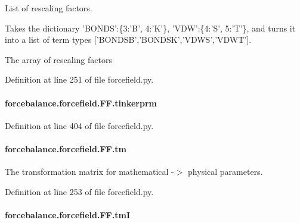 List of rescaling factors. 

Takes the dictionary 'B\-O\-N\-D\-S'\-:\{3\-:'B', 4\-:'K'\}, 'V\-D\-W'\-:\{4\-:'S', 5\-:'T'\}, and turns it into a list of term types \mbox{[}'B\-O\-N\-D\-S\-B','B\-O\-N\-D\-S\-K','V\-D\-W\-S','V\-D\-W\-T'\mbox{]}.

The array of rescaling factors 

Definition at line 251 of file forcefield.\-py.

\hypertarget{classforcebalance_1_1forcefield_1_1FF_a62aa95ac960282ccae808ba05e3ecda1}{
\paragraph[{tinkerprm}]{\setlength{\rightskip}{0pt plus 5cm}forcebalance.\-forcefield.\-F\-F.\-tinkerprm}}\label{classforcebalance_1_1forcefield_1_1FF_a62aa95ac960282ccae808ba05e3ecda1}


Definition at line 404 of file forcefield.\-py.

\hypertarget{classforcebalance_1_1forcefield_1_1FF_aaf4763b05f3c1f7762d5c4d656ad106a}{
\paragraph[{tm}]{\setlength{\rightskip}{0pt plus 5cm}forcebalance.\-forcefield.\-F\-F.\-tm}}\label{classforcebalance_1_1forcefield_1_1FF_aaf4763b05f3c1f7762d5c4d656ad106a}


The transformation matrix for mathematical -\/$>$ physical parameters. 



Definition at line 253 of file forcefield.\-py.

\hypertarget{classforcebalance_1_1forcefield_1_1FF_a3a288d2514106e171af1d0e31311f97a}{
\paragraph[{tm\-I}]{\setlength{\rightskip}{0pt plus 5cm}forcebalance.\-forcefield.\-F\-F.\-tm\-I}}\label{classforcebalance_1_1forcefield_1_1FF_a3a288d2514106e171af1d0e31311f97a}


